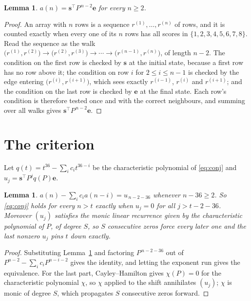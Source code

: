 \documentclass[11pt,a4paper]{article}
\theoremstyle{plain}
\newtheorem{lemma}[theorem]{Lemma}
\theoremstyle{definition}
\begin{document}
\begin{lemma}\label{lem:walk}
$a(n)=\mathbf{s}^{\!\top}P^{\,n-2}\mathbf{e}$ for every $n\ge2$.
\end{lemma}

\begin{proof}
An array with $n$ rows is a sequence $r^{(1)},\dots,r^{(n)}$ of rows, and it is counted
exactly when every one of its $n$ rows has all scores in $\{1,2,3,4,5,6,7,8\}$. Read the sequence as the
walk $\bigl(r^{(1)},r^{(2)}\bigr)\to\bigl(r^{(2)},r^{(3)}\bigr)\to\cdots\to
\bigl(r^{(n-1)},r^{(n)}\bigr)$, of length $n-2$. The condition on the first row is
checked by $\mathbf{s}$ at the initial state, because a first row has no row above it; the
condition on row $i$ for $2\le i\le n-1$ is checked by the edge entering
$\bigl(r^{(i)},r^{(i+1)}\bigr)$, which sees exactly $r^{(i-1)}$, $r^{(i)}$ and
$r^{(i+1)}$; and the condition on the last row is checked by $\mathbf{e}$ at the final
state. Each row's condition is therefore tested once and with the correct neighbours, and
summing over all walks gives $\mathbf{s}^{\!\top}P^{\,n-2}\mathbf{e}$.
\end{proof}

\section{The criterion}

Let $q(t)=t^{36}-\sum_i c_i t^{36-i}$ be the characteristic polynomial of
\eqref{eq:conj} and $u_j=\mathbf{s}^{\!\top}P^{j}q(P)\mathbf{e}$.

\begin{lemma}\label{lem:crit}
$a(n)-\sum_i c_i a(n-i)=u_{\,n-2-36}$ whenever $n-36\ge2$. So \eqref{eq:conj}
holds for every $n>t$ exactly when $u_j=0$ for all $j>t-2-36$. Moreover $(u_j)$
satisfies the monic linear recurrence given by the characteristic polynomial of $P$, of
degree $S$, so $S$ consecutive zeros force every later one and the last nonzero $u_j$ pins
$t$ down exactly.
\end{lemma}

\begin{proof}
Substituting Lemma~\ref{lem:walk} and factoring $P^{\,n-2-36}$ out of
$P^{n-2}-\sum_i c_i P^{n-i-2}$ gives the identity, and letting the exponent run gives the
equivalence. For the last part, Cayley--Hamilton gives $\chi(P)=0$ for the characteristic
polynomial $\chi$, so $\chi$ applied to the shift annihilates $(u_j)$; $\chi$ is monic of
degree $S$, which propagates $S$ consecutive zeros forward.
\end{proof}
\end{document}
